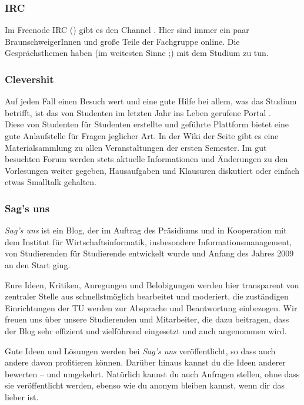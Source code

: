 \subsubsection*{IRC}

Im Freenode IRC () gibt es den Channel . Hier sind immer ein paar BraunschweigerInnen und große Teile der Fachgruppe online. Die Gesprächsthemen haben (im weitesten Sinne ;) mit dem Studium zu tun.

\subsubsection*{Clevershit}

Auf jeden Fall einen Besuch wert und eine gute Hilfe bei allem, was das Studium betrifft, ist das von Studenten im letzten Jahr ins Leben gerufene Portal \mbox{}.\\
Diese von Studenten für Studenten erstellte und geführte Plattform bietet eine gute Anlaufstelle für Fragen jeglicher Art. In der Wiki der Seite gibt es eine Materialsammlung zu allen Veranstaltungen der ersten Semester. Im gut besuchten Forum werden stets aktuelle Informationen und Änderungen zu den Vorlesungen weiter gegeben, Hausaufgaben und Klausuren diskutiert oder einfach etwas Smalltalk gehalten.

\subsubsection*{Sag's uns}
\emph{Sag's uns} ist ein Blog, der im Auftrag des Präsidiums und in Kooperation mit dem Institut für Wirtschaftsinformatik, insbesondere Informationsmanagement, von Studierenden für Studierende entwickelt wurde und Anfang des Jahres 2009 an den Start ging.

Eure Ideen, Kritiken, Anregungen und Belobigungen werden hier transparent von zentraler Stelle aus schnellstmöglich bearbeitet und moderiert, die zuständigen Einrichtungen der TU werden zur Absprache und Beantwortung einbezogen. 
Wir freuen uns über unsere Studierenden und Mitarbeiter, die dazu beitragen, dass der Blog sehr effizient und zielführend eingesetzt und auch angenommen wird.

Gute Ideen und Lösungen werden bei \emph{Sag's uns} veröffentlicht, so dass auch andere davon profitieren können.
Darüber hinaus kannst du die Ideen anderer bewerten – und umgekehrt. Natürlich kannst du auch Anfragen stellen, ohne dass sie veröffentlicht werden, ebenso wie du anonym bleiben kannst, wenn dir das lieber ist.

